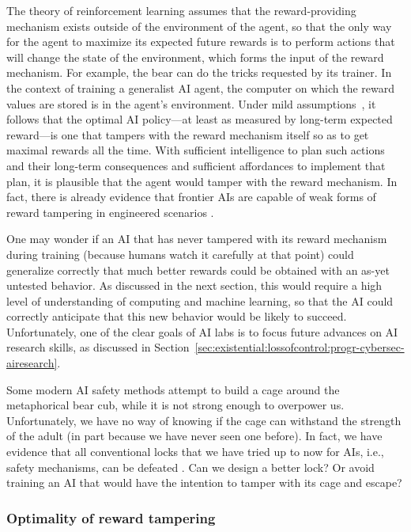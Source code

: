 The theory of reinforcement learning assumes that the reward-providing mechanism exists outside of the environment of the agent, so that the only way for the agent to maximize its expected future rewards is to perform actions that will change the state of the environment, which forms the input of the reward mechanism. For example, the bear can do the tricks requested by its trainer. In the context of training a generalist AI agent, the computer on which the reward values are stored is in the agent's environment. Under mild assumptions~\cite{ojs.aaai.org.aimagazine.index.php.aimagazine.article.view.15084}, it follows that the optimal AI policy---at least as measured by long-term expected reward---is one that tampers with the reward mechanism itself so as to get maximal rewards all the time. With sufficient intelligence to plan such actions and their long-term consequences and sufficient affordances to implement that plan, it is plausible that the agent would tamper with the reward mechanism. In fact, there is already evidence that frontier AIs are capable of weak forms of reward tampering in engineered scenarios \cite{arxiv.org.abs.2406.10162}. 

One may wonder if an AI that has never tampered with its reward mechanism during training (because humans watch it carefully at that point) could generalize correctly that much better rewards could be obtained with an as-yet untested behavior. As discussed in the next section, this would require a high level of understanding of computing and machine learning, so that the AI could correctly anticipate that this new behavior would be likely to succeed. Unfortunately, one of the clear goals of AI labs is to focus future advances on AI research skills, as discussed in Section~\ref{sec:existential:lossofcontrol:progr-cybersec-airesearch}.

Some modern AI safety methods attempt to build a cage around the metaphorical bear cub, while it is not strong enough to overpower us. Unfortunately, we have no way of knowing if the cage can withstand the strength of the adult (in part because we have never seen one before). In fact, we have evidence that all conventional locks that we have tried up to now for AIs, i.e., safety mechanisms, can be defeated \cite{arxiv.org.abs.2307.15043}. Can we design a better lock? Or avoid training an AI that would have the intention to tamper with its cage and escape?    

\subsubsection{Optimality of reward tampering}
\label{sec:existential:misagencyreward:optimality}

